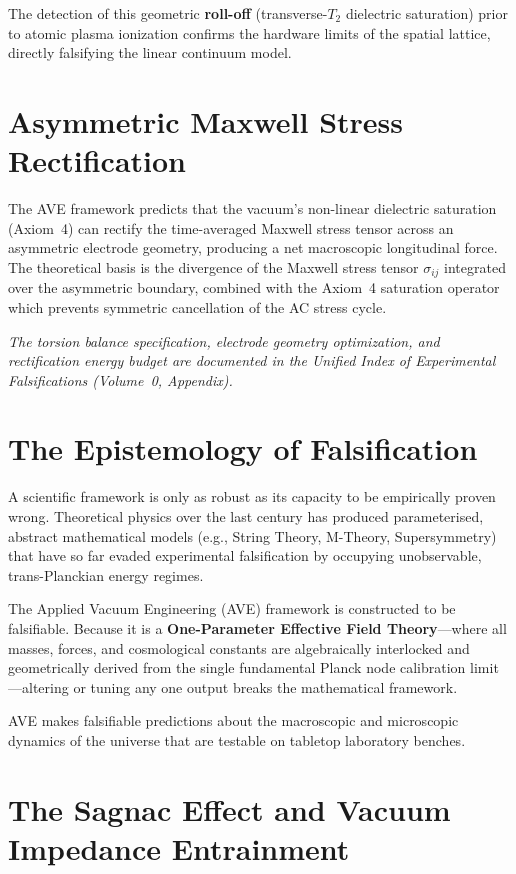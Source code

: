 The detection of this geometric \textbf{roll-off} (transverse-$T_2$ dielectric saturation) prior to atomic plasma ionization confirms the hardware limits of the spatial lattice, directly falsifying the linear continuum model.

\section{Asymmetric Maxwell Stress Rectification}
\label{sec:asymmetric_maxwell_stress}

The AVE framework predicts that the vacuum's non-linear dielectric saturation (Axiom~4) can rectify the time-averaged Maxwell stress tensor across an asymmetric electrode geometry, producing a net macroscopic longitudinal force. The theoretical basis is the divergence of the Maxwell stress tensor $\sigma_{ij}$ integrated over the asymmetric boundary, combined with the Axiom~4 saturation operator which prevents symmetric cancellation of the AC stress cycle.

\textit{The torsion balance specification, electrode geometry optimization, and rectification energy budget are documented in the Unified Index of Experimental Falsifications (Volume~0, Appendix).}




\section{The Epistemology of Falsification}

A scientific framework is only as robust as its capacity to be empirically proven wrong. Theoretical physics over the last century has produced parameterised, abstract mathematical models (e.g., String Theory, M-Theory, Supersymmetry) that have so far evaded experimental falsification by occupying unobservable, trans-Planckian energy regimes.

The Applied Vacuum Engineering (AVE) framework is constructed to be falsifiable. Because it is a \textbf{One-Parameter Effective Field Theory}---where all masses, forces, and cosmological constants are algebraically interlocked and geometrically derived from the single fundamental Planck node calibration limit---altering or tuning any one output breaks the mathematical framework. 

AVE makes falsifiable predictions about the macroscopic and microscopic dynamics of the universe that are testable on tabletop laboratory benches.

\section{The Sagnac Effect and Vacuum Impedance Entrainment}
\label{sec:sagnac_induction_predictions}

